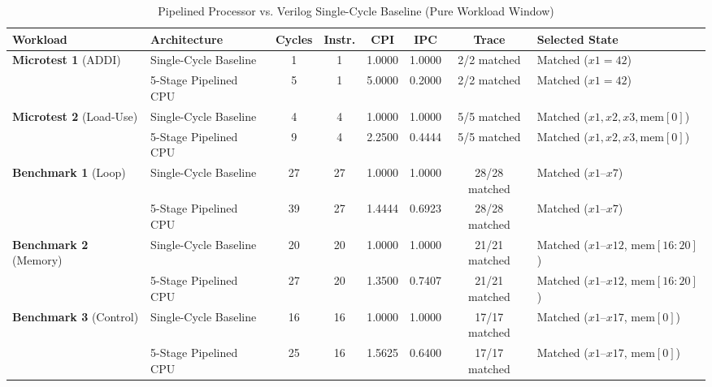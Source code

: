 \documentclass[conference]{IEEEtran}
\begin{document}
\begin{table}[htbp]
\caption{Pipelined Processor vs. Verilog Single-Cycle Baseline (Pure Workload Window)}
\label{tab:single_cycle}
\centering
\small
\begin{tabularx}{\textwidth}{@{}llcccccX@{}}
\toprule
\textbf{Workload} & \textbf{Architecture} & \textbf{Cycles} & \textbf{Instr.} & \textbf{CPI} & \textbf{IPC} & \textbf{Trace} & \textbf{Selected State} \\
\midrule
\textbf{Microtest 1} (ADDI) & Single-Cycle Baseline & 1  & 1  & 1.0000 & 1.0000 & 2/2 matched   & Matched ($x1 = 42$) \\
                            & 5-Stage Pipelined CPU & 5  & 1  & 5.0000 & 0.2000 & 2/2 matched   & Matched ($x1 = 42$) \\
\addlinespace
\textbf{Microtest 2} (Load-Use) & Single-Cycle Baseline & 4  & 4  & 1.0000 & 1.0000 & 5/5 matched   & Matched ($x1, x2, x3, \text{mem}[0]$) \\
                                & 5-Stage Pipelined CPU & 9  & 4  & 2.2500 & 0.4444 & 5/5 matched   & Matched ($x1, x2, x3, \text{mem}[0]$) \\
\addlinespace
\textbf{Benchmark 1} (Loop) & Single-Cycle Baseline & 27 & 27 & 1.0000 & 1.0000 & 28/28 matched & Matched ($x1$--$x7$) \\
                            & 5-Stage Pipelined CPU & 39 & 27 & 1.4444 & 0.6923 & 28/28 matched & Matched ($x1$--$x7$) \\
\addlinespace
\textbf{Benchmark 2} (Memory) & Single-Cycle Baseline & 20 & 20 & 1.0000 & 1.0000 & 21/21 matched & Matched ($x1$--$x12$, $\text{mem}[16:20]$) \\
                              & 5-Stage Pipelined CPU & 27 & 20 & 1.3500 & 0.7407 & 21/21 matched & Matched ($x1$--$x12$, $\text{mem}[16:20]$) \\
\addlinespace
\textbf{Benchmark 3} (Control) & Single-Cycle Baseline & 16 & 16 & 1.0000 & 1.0000 & 17/17 matched & Matched ($x1$--$x17$, $\text{mem}[0]$) \\
                               & 5-Stage Pipelined CPU & 25 & 16 & 1.5625 & 0.6400 & 17/17 matched & Matched ($x1$--$x17$, $\text{mem}[0]$) \\
\bottomrule
\end{tabularx}
\end{table}
\end{document}
